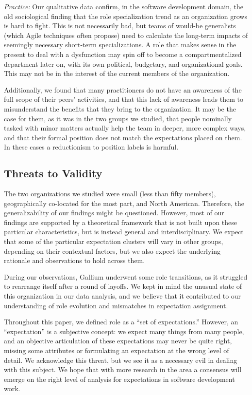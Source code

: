 \documentclass[10pt, conference, compsocconf]{IEEEtran}
\begin{document}
\emph{Practice:} Our qualitative data confirm, in the software development domain, the old sociological finding that the role specialization trend as an organization grows is hard to fight. This is not necessarily bad, but teams of would-be generalists (which Agile techniques often propose) need to calculate the long-term impacts of seemingly necessary short-term specializations. A role that makes sense in the present to deal with a dysfunction may spin off to become a compartmentalized department later on, with its own political, budgetary, and organizational goals. This may not be in the interest of the current members of the organization.

Additionally, we found that many practitioners do not have an awareness of the full scope of their peers' activities, and that this lack of awareness leads them to misunderstand the benefits that they bring to the organization. It may be the case for them, as it was in the two groups we studied, that people nominally tasked with minor matters actually help the team in deeper, more complex ways, and that their formal position does not match the expectations placed on them. In these cases a reductionism to position labels is harmful.



\subsection{Threats to Validity}

The two organizations we studied were small (less than fifty members), geographically co-located for the most part, and North American. Therefore, the generalizability of our findings might be questioned. However, most of our findings are supported by a theoretical framework that is not built upon these particular characteristics, but is instead general and interdisciplinary. We expect that some of the particular expectation clusters will vary in other groups, depending on their contextual factors, but we also expect the underlying rationale and observations to hold across them.

During our observations, Gallium underwent some role transitions, as it struggled to rearrange itself after a round of layoffs. We kept in mind the unusual state of this organization in our data analysis, and we believe that it contributed to our understanding of role evolution and mismatches in expectation assignment.

Throughout this paper, we defined role as a ``set of expectations.'' However, an ``expectation'' is a subjective concept: we expect many things from many people, and an objective articulation of these expectations may never be quite right, missing some attributes or formulating an expectation at the wrong level of detail. We acknowledge this threat, but we see it as a necessary evil in dealing with this subject. We hope that with more research in the area a consensus will emerge on the right level of analysis for expectations in software development work.
\end{document}
